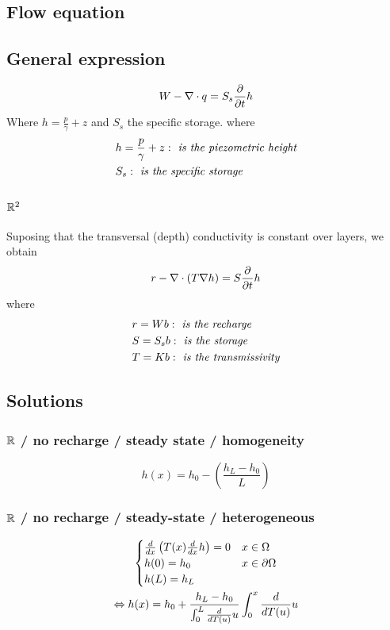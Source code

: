 \documentclass[landscape]{article}
\begin{document}
\begin{multicols*}{3}
\section{Flow equation} %
\label{sec:flow_equation}

\subsection{General expression} %
\label{sub:general_expression}
\[
  W - \nabla \cdot q = S_s \frac{\partial }{\partial t}h
\]  
Where $h = \frac{p}{\gamma} + z$ and $S_s$ the specific storage.
where
$$
  \begin{aligned}
        & h = \frac{p}{\gamma} + z: \emph{ is the piezometric height}\\
        &S_s: \emph{ is the specific storage}
  \end{aligned}\notag
$$

\subsubsection{$\mathbb{R}^2$} %
\label{ssub:r_2}
  Suposing that the transversal (depth) conductivity is constant over layers, we obtain
  \[
  r - \nabla \cdot (T\nabla h) = S \frac{\partial }{\partial t}h
  \]
where
$$
  \begin{aligned}
        & r = Wb: \emph{ is the recharge}\\
        &S=S_s b: \emph{ is the storage}\\
        &T = Kb: \emph{ is the transmissivity}
  \end{aligned}\notag
$$



\subsection{Solutions} %
\label{sub:solutions}

\subsubsection{$\mathbb{R}$ / no recharge / steady state / homogeneity} %
\label{ssub:1}
\[
  h(x) = h_0 - \left(\frac{h_L-h_0}{L}\right) 
\]

\subsubsection{$\mathbb{R}$ / no recharge / steady-state / heterogeneous} %
\label{ssub:2}
\begin{multline*}
  \begin{cases}
    \frac{d }{d x}\left(T(x)\frac{d }{d x}h\right) = 0 & x \in \Omega \\
    h(0) = h_0 & x \in \partial\Omega \\
    h(L) = h_L
  \end{cases}\\
  \Leftrightarrow h(x) = h_0 + \frac{h_L - h_0}{\int_0^L \frac{d }{d T(u)}u}\int_0^x\frac{d }{d T(u)}u
\end{multline*}


\end{multicols*}
\end{document}
